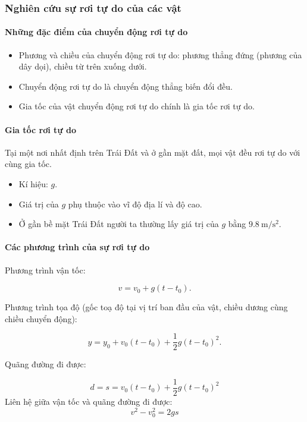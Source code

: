 \begin{tomtat}
	\subsubsection{Nghiên cứu sự rơi tự do của các vật}
	\paragraph{Những đặc điểm của chuyển động rơi tự do}
	\begin{itemize}
		\item Phương và chiều của chuyển động rơi tự do: phương thẳng đứng (phương của dây dọi), chiều từ trên xuống dưới.
		\item Chuyển động rơi tự do là chuyển động thẳng biến đổi đều.
		\item Gia tốc của vật chuyển động rơi tự do chính là gia tốc rơi tự do.
	\end{itemize}	
	
	\paragraph{Gia tốc rơi tự do}
	Tại một nơi nhất định trên Trái Đất và ở gần mặt đất, mọi vật đều rơi tự do với cùng gia tốc.
	\begin{itemize}
		\item Kí hiệu: $g$.
		\item Giá trị của $g$ phụ thuộc vào vĩ độ địa lí và độ cao.
		\item Ở gần bề mặt Trái Đất người ta thường lấy giá trị của $g$ bằng $\SI{9.8}{\meter/\second^2}$.
	\end{itemize}
	\paragraph{Các phương trình của sự rơi tự do}
	
	Phương trình vận tốc:
	
	\begin{equation*}
		v = v_0+g(t -t_0).
	\end{equation*}
	
	Phương trình tọa độ (gốc toạ độ tại vị trí ban đầu của vật, chiều dương cùng chiều chuyển động):
	
	\begin{equation*}
		y = y_0 +v_0(t-t_0)+ \dfrac{1}{2}g(t -t_0)^2.
	\end{equation*}
	
	Quãng đường đi được:
	
	\begin{equation*}
		d= s = v_0(t-t_0)+\dfrac{1}{2} g (t-t_0)^2
	\end{equation*}
	Liên hệ giữa vận tốc và quãng đường đi được:
	$$v^2-v^2_0=2gs$$
	

\end{tomtat}
